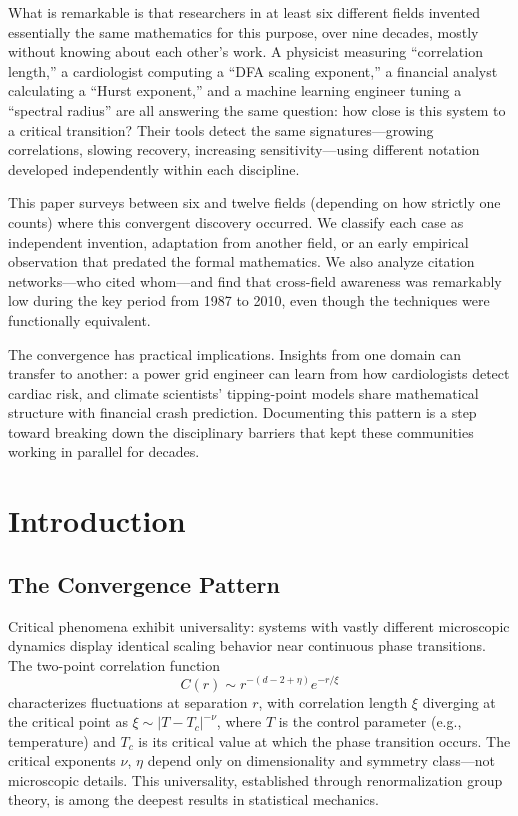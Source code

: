 \documentclass[11pt]{article}
\begin{document}
What is remarkable is that researchers in at least six different fields invented essentially the same mathematics for this purpose, over nine decades, mostly without knowing about each other's work. A physicist measuring ``correlation length,'' a cardiologist computing a ``DFA scaling exponent,'' a financial analyst calculating a ``Hurst exponent,'' and a machine learning engineer tuning a ``spectral radius'' are all answering the same question: how close is this system to a critical transition? Their tools detect the same signatures---growing correlations, slowing recovery, increasing sensitivity---using different notation developed independently within each discipline.

This paper surveys between six and twelve fields (depending on how strictly one counts) where this convergent discovery occurred. We classify each case as independent invention, adaptation from another field, or an early empirical observation that predated the formal mathematics. We also analyze citation networks---who cited whom---and find that cross-field awareness was remarkably low during the key period from 1987 to 2010, even though the techniques were functionally equivalent.

The convergence has practical implications. Insights from one domain can transfer to another: a power grid engineer can learn from how cardiologists detect cardiac risk, and climate scientists' tipping-point models share mathematical structure with financial crash prediction. Documenting this pattern is a step toward breaking down the disciplinary barriers that kept these communities working in parallel for decades.

\section{Introduction}
\label{sec:intro}

\subsection{The Convergence Pattern}

Critical phenomena exhibit universality: systems with vastly different microscopic dynamics display identical scaling behavior near continuous phase transitions. The two-point correlation function
\begin{equation}
C(r) \sim r^{-(d-2+\eta)} e^{-r/\xi}
\end{equation}
characterizes fluctuations at separation $r$, with correlation length $\xi$ diverging at the critical point as $\xi \sim |T-T_c|^{-\nu}$, where $T$ is the control parameter (e.g., temperature) and $T_c$ is its critical value at which the phase transition occurs. The critical exponents $\nu$, $\eta$ depend only on dimensionality and symmetry class---not microscopic details. This universality, established through renormalization group theory, is among the deepest results in statistical mechanics.
\end{document}
